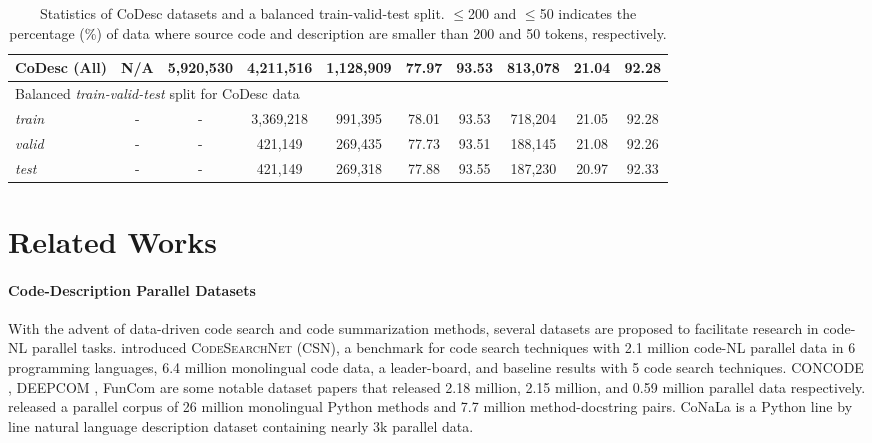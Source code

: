 \documentclass[11pt,a4paper]{article}
\begin{document}
\begin{table*}
{\begin{tabular}{l|c|c|c|c|c|c|c|c|c}
CoDesc (All) & N/A & 5,920,530 & 4,211,516 & 1,128,909 & 77.97 & 93.53 & 813,078 & 21.04 & 92.28 \\
\hline
\multicolumn{10}{l}{Balanced \textit{train-valid-test} split for CoDesc data} \\
\hline
\textit{train} & \multicolumn{1}{c|}{-} & \multicolumn{1}{c|}{-} & 3,369,218 & 991,395 & 78.01 & 93.53 & 718,204 & 21.05 & 92.28 \\
\textit{valid} & \multicolumn{1}{c|}{-} & \multicolumn{1}{c|}{-} & 421,149 & 269,435 & 77.73 & 93.51 & 188,145 & 21.08 & 92.26 \\
\textit{test} & \multicolumn{1}{c|}{-} & \multicolumn{1}{c|}{-} & 421,149 & 269,318 & 77.88 & 93.55  & 187,230 & 20.97 & 92.33 \\
\hline 
\end{tabular}
}
\caption{Statistics of CoDesc datasets and a balanced train-valid-test split. $\leq$200 and $\leq$50 indicates the percentage (\%) of data where source code and description are smaller than 200 and 50 tokens, respectively.}
\label{tab:data-description}
\end{table*}
 
\section{Related Works}
\label{sec:related-works}
\paragraph{Code-Description Parallel Datasets}




With the advent of data-driven code search and code summarization methods, several datasets are proposed to facilitate research in code-NL parallel tasks.
\citet{husain2019codesearchnet} introduced \textsc{CodeSearchNet (CSN)}, a benchmark for code search techniques with 2.1 million code-NL parallel data in 6 programming languages, 6.4 million monolingual code data, a leader-board, and baseline results with 5 code search techniques. CONCODE \cite{concode}, DEEPCOM \cite{deepcom}, FunCom \cite{funcom} are some notable dataset papers that released 2.18 million, 2.15 million, and 0.59 million parallel data respectively. \citet{pymt5} released a parallel corpus of 26 million monolingual Python methods and 7.7 million method-docstring pairs. CoNaLa \cite{conala} is a Python line by line natural language description dataset containing nearly 3k parallel data.
\end{document}
